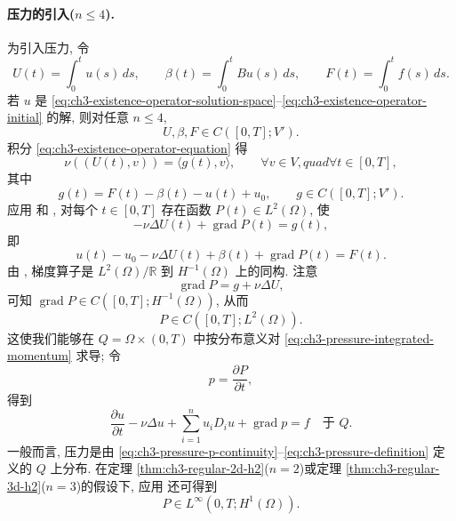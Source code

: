 \paragraph{压力的引入($n\leq4$).}
\label{par:ch3-pressure-introduction}
为引入压力, 令
\[
U(t)=\int_0^t u(s)\,ds,
\qquad\beta(t)=\int_0^t Bu(s)\,ds,
\qquad F(t)=\int_0^t f(s)\,ds.
\]
若 $u$ 是 \eqref{eq:ch3-existence-operator-solution-space}--\eqref{eq:ch3-existence-operator-initial} 的解, 则对任意 $n\leq4$,
\begin{equation}
U,\beta,F\in C([0,T];V').
\label{eq:ch3-pressure-integrated-functions-continuity}
\end{equation}
积分 \eqref{eq:ch3-existence-operator-equation} 得
\begin{equation}
\nu((U(t),v))=\langle g(t),v\rangle,
\qquad\forall v\in V,quad\forall t\in[0,T],
\label{eq:ch3-pressure-integrated-variational-equation}
\end{equation}
其中
\[
g(t)=F(t)-\beta(t)-u(t)+u_0,
\qquad g\in C([0,T];V').
\]
应用  和 , 对每个 $t\in[0,T]$ 存在函数 $P(t)\in L^2(\Omega)$, 使
\[
-\nu\Delta U(t)+\operatorname{grad}P(t)=g(t),
\]
即
\begin{equation}
u(t)-u_0-\nu\Delta U(t)+\beta(t)+\operatorname{grad}P(t)=F(t).
\label{eq:ch3-pressure-integrated-momentum}
\end{equation}
由 , 梯度算子是 $L^2(\Omega)/\mathbb R$ 到 $H^{-1}(\Omega)$ 上的同构. 注意
\[
\operatorname{grad}P=g+\nu\Delta U,
\]
可知 $\operatorname{grad}P\in C([0,T];H^{-1}(\Omega))$, 从而
\begin{equation}
P\in C([0,T];L^2(\Omega)).
\label{eq:ch3-pressure-p-continuity}
\end{equation}
这使我们能够在 $Q=\Omega\times(0,T)$ 中按分布意义对 \eqref{eq:ch3-pressure-integrated-momentum} 求导; 令
\begin{equation}
p=\frac{\partial P}{\partial t},
\label{eq:ch3-pressure-definition}
\end{equation}
得到
\begin{equation}
\frac{\partial u}{\partial t}-\nu\Delta u
+\sum_{i=1}^{n}u_iD_iu+\operatorname{grad}p=f
\quad\text{于 }Q.
\label{eq:ch3-pressure-distributional-momentum}
\end{equation}
一般而言, 压力是由 \eqref{eq:ch3-pressure-p-continuity}--\eqref{eq:ch3-pressure-definition} 定义的 $Q$ 上分布. 在定理 \ref{thm:ch3-regular-2d-h2}($n=2$)或定理 \ref{thm:ch3-regular-3d-h2}($n=3$)的假设下, 应用  还可得到
\begin{equation}
P\in L^\infty(0,T;H^1(\Omega)).
\label{eq:ch3-pressure-p-h1-linfty}
\end{equation}

